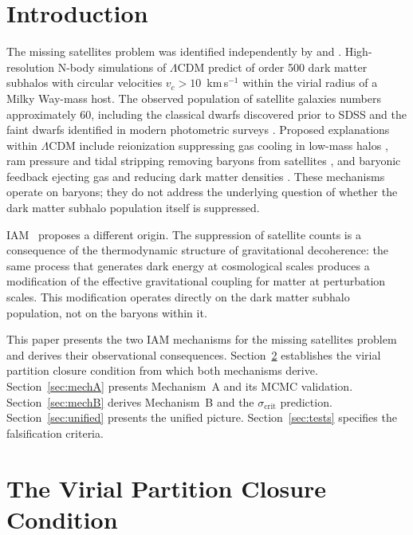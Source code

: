 \documentclass[12pt,a4paper]{article}
\begin{document}
\section{Introduction}
\label{sec:intro}

The missing satellites problem was identified independently by
\citet{Klypin1999} and \citet{Moore1999}. High-resolution N-body simulations
of $\Lambda$CDM predict of order 500 dark matter subhalos with circular
velocities $v_c > 10$~km\,s$^{-1}$ within the virial radius of a Milky
Way-mass host. The observed population of satellite galaxies numbers
approximately 60, including the classical dwarfs discovered prior to SDSS and
the faint dwarfs identified in modern photometric surveys
\citep{Koposov2008, Tollerud2008}. Proposed explanations within $\Lambda$CDM
include reionization suppressing gas cooling in low-mass halos
\citep{Bullock2000, Benson2002}, ram pressure and tidal stripping removing
baryons from satellites \citep{Mayer2006}, and baryonic feedback ejecting gas
and reducing dark matter densities \citep{Read2005, Pontzen2012}. These
mechanisms operate on baryons; they do not address the underlying question of
whether the dark matter subhalo population itself is suppressed.

IAM~\citep{IAM_theory,IAM_obs} proposes a different origin. The suppression
of satellite counts is a consequence of the thermodynamic structure of
gravitational decoherence: the same process that generates dark energy at
cosmological scales produces a modification of the effective gravitational
coupling for matter at perturbation scales. This modification operates
directly on the dark matter subhalo population, not on the baryons within it.

This paper presents the two IAM mechanisms for the missing satellites problem
and derives their observational consequences. Section~\ref{sec:virial_closure}
establishes the virial partition closure condition from which
both mechanisms derive. Section~\ref{sec:mechA} presents Mechanism~A and its
MCMC validation. Section~\ref{sec:mechB} derives Mechanism~B and the
$\sigma_\mathrm{crit}$ prediction. Section~\ref{sec:unified} presents the
unified picture. Section~\ref{sec:tests} specifies the falsification criteria.

\section{The Virial Partition Closure Condition}
\label{sec:virial_closure}
\end{document}
